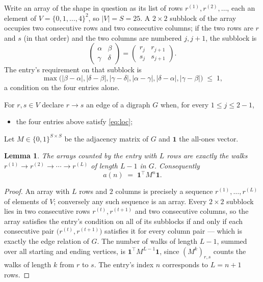 \documentclass[11pt,a4paper]{article}
\theoremstyle{plain}
\newtheorem{lemma}[theorem]{Lemma}
\theoremstyle{definition}
\begin{document}
Write an array of the shape in question as its list of rows
$r^{(1)},r^{(2)},\dots$, each an element of
$V=\{0,1,\dots,4\}^{2}$, so $|V|=S=25$. A $2\times2$ subblock of the array
occupies two consecutive rows and two consecutive columns; if the two rows are $r$
and $s$ (in that order) and the two columns are numbered $j,j+1$,
the subblock is
\[
\begin{pmatrix}\alpha&\beta\\\gamma&\delta\end{pmatrix}=\begin{pmatrix}r_j&r_{j+1}\\s_j&s_{j+1}\end{pmatrix}.
\]
The entry's requirement on that subblock is
\begin{equation}\label{eq:loc}
\max\bigl(|\beta-\alpha|,|\delta-\beta|,|\gamma-\delta|,|\alpha-\gamma|,|\delta-\alpha|,|\gamma-\beta|\bigr)\;\le\;1,
\end{equation}
a condition on the four entries alone.

For $r,s\in V$ declare $r\to s$ an edge of a digraph $G$ when, for every
$1\le j\le 2-1$,
\begin{itemize}
\item the four entries above satisfy \eqref{eq:loc};

\end{itemize}
Let $M\in\{0,1\}^{S\times S}$ be the adjacency matrix of $G$ and $\mathbf{1}$ the
all-ones vector.

\begin{lemma}\label{lem:walk}
The arrays counted by the entry with $L$ rows are exactly the walks
$r^{(1)}\to r^{(2)}\to\cdots\to r^{(L)}$ of length $L-1$ in $G$. Consequently
\[
a(n)\;=\;\mathbf{1}^{\!\top}M^{n}\mathbf{1} .
\]
\end{lemma}

\begin{proof}
An array with $L$ rows and $2$ columns is precisely a sequence
$r^{(1)},\dots,r^{(L)}$ of elements of $V$; conversely any such sequence is an array.
Every $2\times2$ subblock lies in two consecutive rows $r^{(t)},r^{(t+1)}$ and two
consecutive columns, so the array satisfies the entry's condition on all of its subblocks
if and only if each consecutive pair $\bigl(r^{(t)},r^{(t+1)}\bigr)$ satisfies it for
every column pair --- which is exactly the edge relation of $G$. The number of walks of
length $L-1$, summed over all starting and ending vertices, is
$\mathbf{1}^{\!\top}M^{L-1}\mathbf{1}$, since $(M^{k})_{r,s}$ counts the walks of
length $k$ from $r$ to $s$. The entry's index $n$ corresponds to $L=n+1$ rows.
\end{proof}
\end{document}
